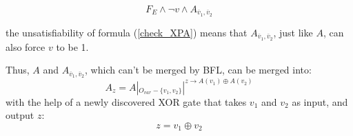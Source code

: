 \documentclass[journal]{IEEEtran}
\begin{document}
\begin{equation}\label{check_XPA}
F_E\wedge \neg v\wedge A_{\overline{v}_1,\overline{v}_2}
\end{equation}

%
%
%
%
%
%
%

the unsatisfiability of formula (\ref{check_XPA}) means that $A_{\overline{v}_1,\overline{v}_2}$,
just like $A$,
can also force $v$ to be 1.

Thus,
$A$ and $A_{\overline{v}_1,\overline{v}_2}$,
which can't be merged by BFL,
can be merged into:
\begin{equation}\label{mergeA}
A_z= A|_{O_{var}-\{v_1,v_2\}}|^{z\to A(v_1)\oplus A(v_2)}
\end{equation}
with the help of a newly discovered XOR gate that takes $v_1$ and $v_2$ as input,
and output $z$:
\begin{equation}
z=v_1\oplus v_2
\end{equation}
\end{document}
